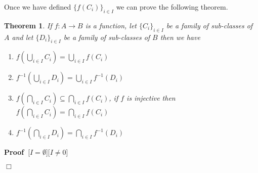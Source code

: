 \documentclass{book}
\newenvironment{proof}{\noindent\textbf{Proof\ }}{\hspace*{\fill}$\Box$\medskip}
\newtheorem{theorem}{Theorem}
\begin{document}
{{Once we have defined $\{ f (C_i) \}_{i \in I}$ we can prove the following
theorem.

\begin{theorem}
  \label{image (preimage) of union , intersections}If $f : A \rightarrow B$ is
  a function, let $\{ C_i \}_{i \in I}$ be a family of sub-classes of $A$ and
  let $\{ D_i \}_{i \in I}$ be a family of sub-classes of $B$ then we have
  \begin{enumerate}
    \item $f \left( \bigcup_{i \in I} C_i \right) = \bigcup_{i \in I} f (C_i)$
    
    \item $f^{- 1} \left( \bigcup_{i \in I} D_i \right) = \bigcup_{i \in I}
    f^{- 1} (D_i)$
    
    \item $f \left( \bigcap_{i \in I} C_i \right) \subseteq \bigcap_{i \in I}
    f (C_i)$, if $f$ is injective then $f \left( \bigcap_{i \in I} C_i \right)
    = \bigcap_{i \in I} f (C_i)$
    
    \item $f^{- 1} \left( \bigcap_{i \in I} D_i \right) = \bigcap_{i \in I}
    f^{- 1} (D_i)$
  \end{enumerate}
\end{theorem}

\begin{proof}[$I = \emptyset$][$I \neq 0$]
  

\end{proof}}}
\end{document}
